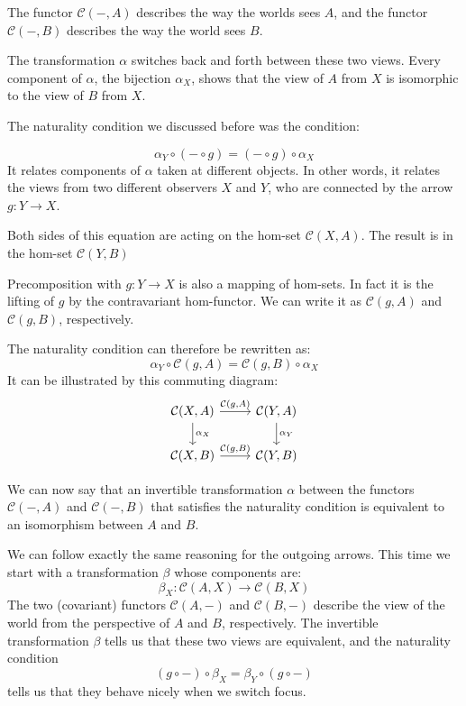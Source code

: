 \documentclass[DaoFP]{subfiles}
\begin{document}
The functor $\mathcal{C}(-, A)$ describes the way the worlds sees $A$, and the functor $\mathcal{C}(-, B)$ describes the way the world sees $B$. 

The transformation $\alpha$ switches back and forth between these two views. Every component of $\alpha$, the bijection $\alpha_X$, shows that the view of $A$ from $X$ is isomorphic to the view of $B$ from $X$. 

The naturality condition we discussed before was the condition:

\[ \alpha_Y \circ (- \circ g) = (- \circ g) \circ \alpha_X \]
It relates components of $\alpha$ taken at different objects. In other words, it relates the views from two different observers $X$ and $Y$, who are connected by the arrow $g \colon Y \to X$. 

Both sides of this equation are acting on the hom-set $\mathcal{C}(X, A)$. The result is in the hom-set $\mathcal{C}(Y, B)$

Precomposition with $g \colon Y \to X$ is also a mapping of hom-sets. In fact it is the lifting of $g$ by the contravariant hom-functor. We can write it as $\mathcal{C}(g, A)$ and $\mathcal{C}(g, B)$, respectively.

The naturality condition can therefore be rewritten as:
\[ \alpha_Y \circ \mathcal{C}(g, A) = \mathcal{C}(g, B) \circ \alpha_X \]
It can be illustrated by this commuting diagram:
\[
 \begin{tikzcd}
 \mathcal{C}(X, A)
 \arrow[d, "\alpha_X"]
 \arrow[r, "{\mathcal{C}(g, A)}"]
 &
 \mathcal{C}(Y, A)
  \arrow[d, "\alpha_Y"]
 \\
 \mathcal{C}(X, B)
 \arrow[r, "{\mathcal{C}(g, B)}"]
& \mathcal{C}(Y, B)
 \end{tikzcd}
\]

We can now say that  an invertible transformation $\alpha$ between the functors $\mathcal{C}(-, A)$ and $\mathcal{C}(-, B)$ that satisfies the naturality condition is equivalent to an isomorphism between $A$ and $B$.

We can follow exactly the same reasoning for the outgoing arrows. This time we start with a transformation $\beta$ whose components are:
\[ \beta_X \colon \mathcal{C}(A, X) \to \mathcal{C}(B, X) \]
The two (covariant) functors $\mathcal{C}(A, -)$ and $\mathcal{C}(B, -)$ describe the view of the world from the perspective of $A$ and $B$, respectively. The invertible transformation $\beta$ tells us that these two views are equivalent, and the naturality condition 
\[ (g \circ -) \circ \beta_X = \beta_Y \circ (g \circ -) \]
tells us that they behave nicely when we switch focus.
\end{document}
